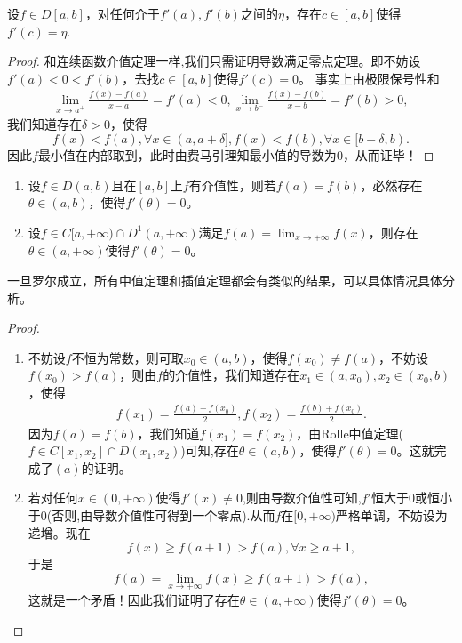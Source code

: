 \documentclass[../../main.tex]{subfiles}%
\begin{document}
\begin{theorem}\label{theorem:导数介值定理}
设\(f \in D[a,b]\)，对任何介于\(f'(a),f'(b)\)之间的\(\eta\)，存在\(c \in [a,b]\)使得\(f'(c)=\eta\).
\end{theorem}
\begin{proof}

和连续函数介值定理一样,我们只需证明导数满足零点定理。即不妨设\(f'(a) < 0 < f'(b)\)，去找\(c \in [a,b]\)使得\(f'(c)=0\)。
事实上由极限保号性和
\begin{align*}
\lim_{x \to a^{+}}\frac{f(x)-f(a)}{x - a}=f'(a)<0,\lim_{x \to b^{-}}\frac{f(x)-f(b)}{x - b}=f'(b)>0,
\end{align*}
我们知道存在\(\delta>0\)，使得
\[f(x)<f(a),\forall x \in (a,a + \delta],f(x)<f(b),\forall x \in [b - \delta,b).\]
因此\(f\)最小值在内部取到，此时由费马引理知最小值的导数为\(0\)，从而证毕！

\end{proof}

\begin{theorem}[加强的Rolle中值定理]\label{theorem:加强的Rolle中值定理}
\begin{enumerate}[(1)]
\item 设\(f \in D(a,b)\)且在\([a,b]\)上\(f\)有介值性，则若\(f(a)=f(b)\)，必然存在\(\theta \in (a,b)\)，使得\(f'(\theta)=0\)。

\item 设\(f \in C[a,+\infty)\cap D^{1}(a,+\infty)\)满足\(f(a)=\lim_{x \to +\infty}f(x)\)，则存在\(\theta \in (a,+\infty)\)使得\(f'(\theta)=0\)。
\end{enumerate}
\end{theorem}
\begin{note}
一旦罗尔成立，所有中值定理和插值定理都会有类似的结果，可以具体情况具体分析。
\end{note}
\begin{proof}
\begin{enumerate}[(1)]
\item 不妨设\(f\)不恒为常数，则可取\(x_0 \in (a,b)\)，使得\(f(x_0)\neq f(a)\)，不妨设\(f(x_0)>f(a)\)，则由\(f\)的介值性，我们知道存在\(x_1 \in (a,x_0),x_2 \in (x_0,b)\)，使得
\begin{align*}
f(x_1)=\frac{f(a)+f(x_0)}{2},f(x_2)=\frac{f(b)+f(x_0)}{2}.
\end{align*}
因为\(f(a)=f(b)\)，我们知道\(f(x_1)=f(x_2)\)，由Rolle中值定理($f\in C[x_1,x_2]\cap D(x_1,x_2)$)可知,存在\(\theta \in (a,b)\)，使得\(f'(\theta)=0\)。这就完成了\((a)\)的证明。

\item 若对任何\(x \in (0,+\infty)\)使得\(f'(x)\neq 0\),则由导数介值性可知,$f'$恒大于0或恒小于0(否则,由导数介值性可得到一个零点).从而\(f\)在\([0,+\infty)\)严格单调，不妨设为递增。现在
\[f(x)\geqslant f(a + 1)>f(a),\forall x\geqslant a + 1,\]
于是
\[f(a)=\lim_{x \to +\infty}f(x)\geqslant f(a + 1)>f(a),\]
这就是一个矛盾！因此我们证明了存在\(\theta \in (a,+\infty)\)使得\(f'(\theta)=0\)。   
\end{enumerate} 

\end{proof}
\end{document}
